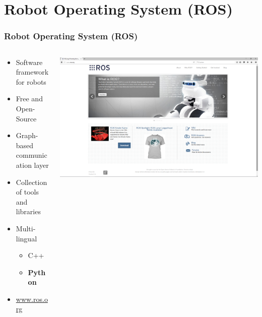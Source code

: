 \documentclass[aspectratio=169]{beamer}
\begin{document}
\section{Robot Operating System (ROS)}

  \begin{frame}
   \frametitle{Robot Operating System (ROS)}
   \begin{columns}[onlytextwidth]
    \begin{column}{0.5\textwidth}
    
      \begin{itemize}
       \item Software framework for robots 
       \item Free and Open-Source 
       \item Graph-based communication layer 
       \item Collection of tools and libraries 
       \item Multi-lingual 
       \begin{itemize}
	\item C++
	\item \textbf{Python} 
       \end{itemize}
       \item \url{www.ros.org}
      \end{itemize}
    
    \end{column}
    \begin{column}{0.5\textwidth}

    \includegraphics[width=1.5\textwidth]{./Abbildungen/ros_screenshot.png}
    
    \end{column}
   \end{columns}
  \end{frame}
\end{document}
